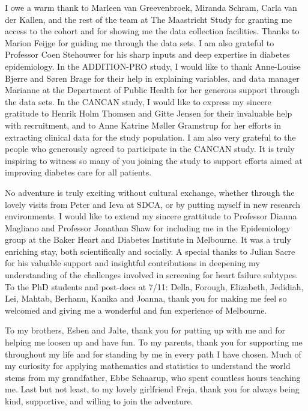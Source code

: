\documentclass[
  a4paper,
  headsepline=true,
  open=left]{scrbook}
\begin{document}
I owe a warm thank to Marleen van Greevenbroek, Miranda Schram, Carla
van der Kallen, and the rest of the team at The Maastricht Study for
granting me access to the cohort and for showing me the data collection
facilities. Thanks to Marion Feijge for guiding me through the data
sets. I am also grateful to Professor Coen Stehouwer for his sharp
inputs and deep expertise in diabetes epidemiology. In the ADDITION-PRO
study, I would like to thank Anne-Louise Bjerre and Søren Brage for
their help in explaining variables, and data manager Marianne at the
Department of Public Health for her generous support through the data
sets. In the CANCAN study, I would like to express my sincere gratitude
to Henrik Holm Thomsen and Gitte Jensen for their invaluable help with
recruitment, and to Anne Katrine Møller Gramstrup for her efforts in
extracting clinical data for the study population. I am also very
grateful to the people who generously agreed to participate in the
CANCAN study. It is truly inspiring to witness so many of you joining
the study to support efforts aimed at improving diabetes care for all
patients.

No adventure is truly exciting without cultural exchange, whether
through the lovely visits from Peter and Ieva at SDCA, or by putting
myself in new research environments. I would like to extend my sincere
grattitude to Professor Dianna Magliano and Professor Jonathan Shaw for
including me in the Epidemiology group at the Baker Heart and Diabetes
Institute in Melbourne. It was a truly enriching stay, both
scientifically and socially. A special thanks to Julian Sacre for his
valuable support and insightful contributions in deepening my
understanding of the challenges involved in screening for heart failure
subtypes. To the PhD students and post-docs at 7/11: Della, Forough,
Elizabeth, Jedidiah, Lei, Mahtab, Berhanu, Kanika and Joanna, thank you
for making me feel so welcomed and giving me a wonderful and fun
experience of Melbourne.

To my brothers, Esben and Jalte, thank you for putting up with me and
for helping me loosen up and have fun. To my parents, thank you for
supporting me throughout my life and for standing by me in every path I
have chosen. Much of my curiosity for applying mathematics and
statistics to understand the world stems from my grandfather, Ebbe
Schaarup, who spent countless hours teaching me. Last but not least, to
my lovely girlfriend Freja, thank you for always being kind, supportive,
and willing to join the adventure.
\end{document}
